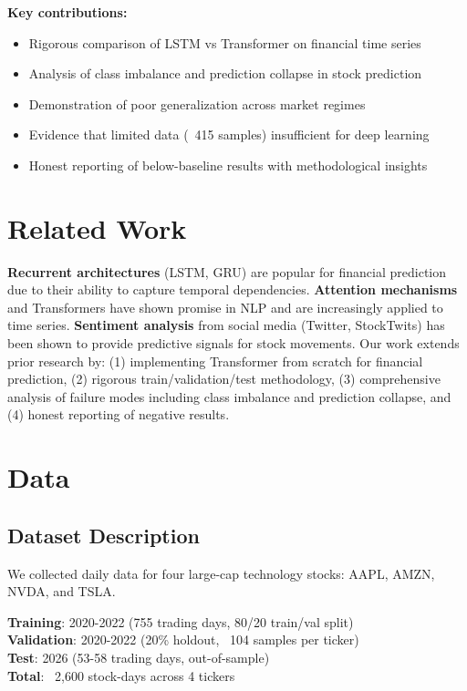\documentclass[10pt,twocolumn]{article}
\begin{document}
\textbf{Key contributions:}
\begin{itemize}
\item Rigorous comparison of LSTM vs Transformer on financial time series
\item Analysis of class imbalance and prediction collapse in stock prediction
\item Demonstration of poor generalization across market regimes
\item Evidence that limited data (~415 samples) insufficient for deep learning
\item Honest reporting of below-baseline results with methodological insights
\end{itemize}

\section{Related Work}

\textbf{Recurrent architectures} (LSTM, GRU) are popular for financial prediction due to their ability to capture temporal dependencies. \textbf{Attention mechanisms} and Transformers have shown promise in NLP and are increasingly applied to time series. \textbf{Sentiment analysis} from social media (Twitter, StockTwits) has been shown to provide predictive signals for stock movements. Our work extends prior research by: (1) implementing Transformer from scratch for financial prediction, (2) rigorous train/validation/test methodology, (3) comprehensive analysis of failure modes including class imbalance and prediction collapse, and (4) honest reporting of negative results.

\section{Data}

\subsection{Dataset Description}

We collected daily data for four large-cap technology stocks: AAPL, AMZN, NVDA, and TSLA.

\textbf{Training}: 2020-2022 (755 trading days, 80/20 train/val split)\\
\textbf{Validation}: 2020-2022 (20\% holdout, ~104 samples per ticker)\\
\textbf{Test}: 2026 (53-58 trading days, out-of-sample)\\
\textbf{Total}: ~2,600 stock-days across 4 tickers
\end{document}
